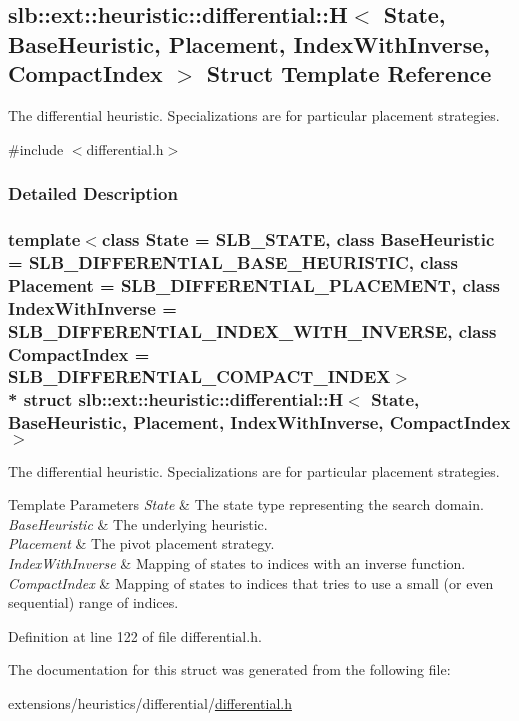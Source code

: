 \hypertarget{structslb_1_1ext_1_1heuristic_1_1differential_1_1H}{}\subsection{slb\+:\+:ext\+:\+:heuristic\+:\+:differential\+:\+:H$<$ State, Base\+Heuristic, Placement, Index\+With\+Inverse, Compact\+Index $>$ Struct Template Reference}
\label{structslb_1_1ext_1_1heuristic_1_1differential_1_1H}


The differential heuristic. Specializations are for particular placement strategies.  




{\ttfamily \#include $<$differential.\+h$>$}



\subsubsection{Detailed Description}
\subsubsection*{template$<$class State = S\+L\+B\+\_\+\+S\+T\+A\+TE, class Base\+Heuristic = S\+L\+B\+\_\+\+D\+I\+F\+F\+E\+R\+E\+N\+T\+I\+A\+L\+\_\+\+B\+A\+S\+E\+\_\+\+H\+E\+U\+R\+I\+S\+T\+IC, class Placement = S\+L\+B\+\_\+\+D\+I\+F\+F\+E\+R\+E\+N\+T\+I\+A\+L\+\_\+\+P\+L\+A\+C\+E\+M\+E\+NT, class Index\+With\+Inverse = S\+L\+B\+\_\+\+D\+I\+F\+F\+E\+R\+E\+N\+T\+I\+A\+L\+\_\+\+I\+N\+D\+E\+X\+\_\+\+W\+I\+T\+H\+\_\+\+I\+N\+V\+E\+R\+SE, class Compact\+Index = S\+L\+B\+\_\+\+D\+I\+F\+F\+E\+R\+E\+N\+T\+I\+A\+L\+\_\+\+C\+O\+M\+P\+A\+C\+T\+\_\+\+I\+N\+D\+EX$>$\\*
struct slb\+::ext\+::heuristic\+::differential\+::\+H$<$ State, Base\+Heuristic, Placement, Index\+With\+Inverse, Compact\+Index $>$}

The differential heuristic. Specializations are for particular placement strategies. 


\begin{DoxyTemplParams}{Template Parameters}
{\em State} & The state type representing the search domain. \\
\hline
{\em Base\+Heuristic} & The underlying heuristic. \\
\hline
{\em Placement} & The pivot placement strategy. \\
\hline
{\em Index\+With\+Inverse} & Mapping of states to indices with an inverse function. \\
\hline
{\em Compact\+Index} & Mapping of states to indices that tries to use a small (or even sequential) range of indices. \\
\hline
\end{DoxyTemplParams}


Definition at line 122 of file differential.\+h.



The documentation for this struct was generated from the following file\+:\begin{DoxyCompactItemize}
\item 
extensions/heuristics/differential/\hyperlink{differential_8h}{differential.\+h}\end{DoxyCompactItemize}
